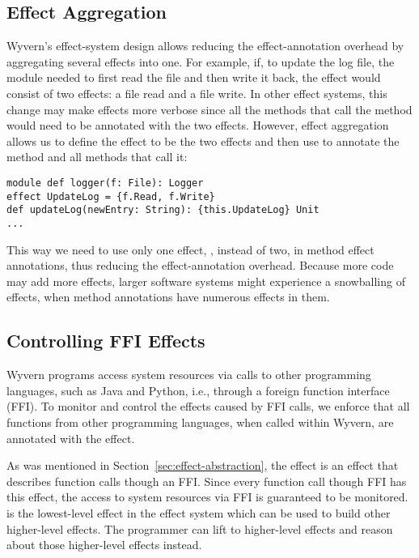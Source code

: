 \subsection{Effect Aggregation}

Wyvern's effect-system design allows reducing the effect-annotation overhead by aggregating several effects into one. For example, if, to update the log file, the  module needed to first read the file and then write it back, the  effect would consist of two effects: a file read and a file write. In other effect systems, this change may make effects more verbose since all the methods that call the  method would need to be annotated with the two effects. However, effect aggregation allows us to define the  effect to be the two effects and then use  to annotate the  method and all methods that call it:

\begin{minipage}{\linewidth}
\begin{lstlisting}[xleftmargin=-5pt, numbers=none]
module def logger(f: File): Logger
effect UpdateLog = {f.Read, f.Write}
def updateLog(newEntry: String): {this.UpdateLog} Unit
...
\end{lstlisting}
\end{minipage}
This way we need to use only one effect, , instead of two, in method effect annotations, thus reducing the effect-annotation overhead. Because more code may add more effects, larger software systems might experience a snowballing of effects, when method annotations have numerous effects in them.


\subsection{Controlling FFI Effects}
Wyvern programs access system resources via calls to other programming languages, such as Java and Python, i.e., through a foreign function interface (FFI). To monitor and control the effects caused by FFI calls, we enforce that all functions from other programming languages, when called within Wyvern, are annotated with the  effect. 

As was mentioned in Section~\ref{sec:effect-abstraction}, the  effect is an effect that describes function calls though an FFI. Since every function call though FFI has this effect, the access to system resources via FFI is guaranteed to be monitored.  is the lowest-level effect in the effect system which can be used to build other higher-level effects. The programmer can lift  to higher-level effects and reason about those higher-level effects instead.


